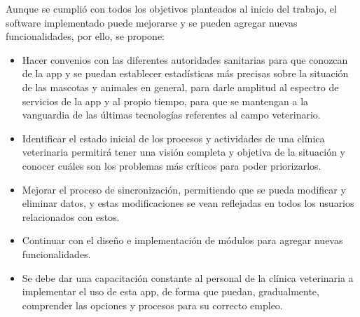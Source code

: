 \begin{recomendations}
	Aunque se cumplió con todos los objetivos planteados al inicio del trabajo, el software implementado puede mejorarse y se pueden agregar nuevas funcionalidades, por ello, se propone:
	
	\begin{itemize}
   \item Hacer convenios con las diferentes autoridades sanitarias para que conozcan
   de la app y se puedan establecer estadísticas más precisas sobre la situación 
   de las mascotas y animales en general, para darle amplitud al espectro de 
   servicios de la app y al propio tiempo, para que se mantengan a la vanguardia 
   de las últimas tecnologías referentes al campo veterinario.
   \item Identificar el estado inicial de los procesos y actividades de una clínica veterinaria 
   permitirá tener una visión completa y objetiva de la situación y conocer cuáles son 
   los problemas más críticos para poder priorizarlos. 
  \item Mejorar el proceso de sincronización, permitiendo que se pueda modificar y eliminar datos, y estas modificaciones se vean reflejadas en todos los usuarios relacionados con estos.
    \item Continuar con el diseño e implementación de módulos para agregar nuevas funcionalidades.
    \item Se debe dar una capacitación constante al personal de la clínica veterinaria a 
   implementar el uso de esta app, de forma que puedan, gradualmente, comprender 
   las opciones y procesos para su correcto empleo.
   	\end{itemize}
\end{recomendations}
